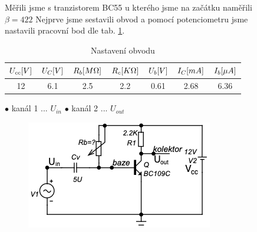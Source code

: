 \documentclass{article}
\newcommand \tab[1]
{ tab. \ref{#1}}
\begin{document}
\begin{figure}[H]
	\begin{minipage}[t]{0.6\textwidth}
    Měřili jsme s tranzistorem BC55 u kterého jsme na začátku naměřili \(\beta = 422\)
    Nejprve jsme sestavili obvod a pomocí potenciometru jsme nastavili pracovní bod dle \tab{tab_pracovni_bod}.
    \begin{table}[H]
      \begin{tabular}{|c|c|c|c|c||c|c|} 
        \hline
         \(U_{cc}\-[V]\) & \(U_{C}\-[V]\)  & \(R_b\-[M\Omega]\) &	\(R_c\-[K\Omega]\) & \(U_{b}\-[V]\) & \(I_{C}\-[mA]\) & \(I_{b}\-[\mu A]\)  \\ \hline
         12              & 6.1             & 2.5                & 2.2                & 0.61           & 2.68            & 6.36                \\ \hline
      \end{tabular}
      \caption{\label{tab_pracovni_bod} Nastavení obvodu}
    \end{table}
   	\(\bullet\) kanál 1 ... \(U_{in}\)  \qquad 	\(\bullet\) kanál 2 ... \(U_{out}\)
  \end{minipage}
  \hfill
	\begin{minipage}[t]{0.4\textwidth}
    \begin{figure}[H]
      \includegraphics[width=\textwidth]{obvod-z-laborky.png}
      \caption{\label{obvod_z_laborky}}
    \end{figure}
  \end{minipage}
\end{figure}
\end{document}
